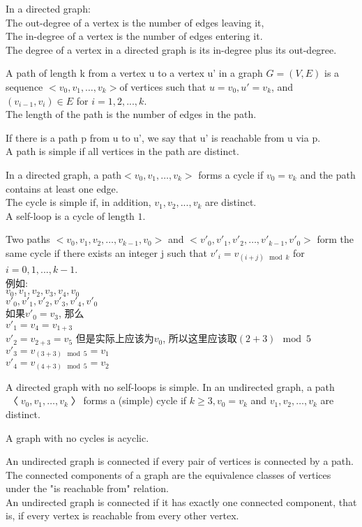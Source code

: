 \documentclass{article}
\begin{document}
\bigskip
In a directed graph:\\
The out-degree of a vertex is the number of edges leaving it,\\
The in-degree of a vertex is the number of edges entering it.\\
The degree of a vertex in a directed graph is its in-degree plus its out-degree.

A path of length k from a vertex u to a vertex u' in a graph $G = (V, E)$ is a sequence $<v_0, v_1, \ldots, v_k>$of vertices such that $u = v_0, u' =v_k$, and $(v_{i-1}, v_i) \in E$ for $i = 1, 2,..., k$. \\
The length of the path is the number of edges in the path.

If there is a path p from u to u', we say that u' is reachable from u via p.\\
A path is simple if all vertices in the path are distinct.

\bigskip
In a directed graph, a path$<v_0, v_1, \ldots, v_k>$ forms a cycle if $v_0=v_k$  and the path contains at least one edge. \\
The cycle is simple if, in addition, $v_1, v_2,..., v_k$ are distinct. \\
A self-loop is a cycle of length $1$.

Two paths $<v_0, v_1, v_2, \ldots,v_{k-1}, v_0>$  and $<v'_0, v'_1, v'_2, \ldots,v'_{k-1}, v'_0>$ form the same cycle if there exists an integer j such that $v'_i=v_{(i+j) \mod k}$ for $i = 0, 1,..., k - 1$.\\
例如:\\
$v_0, v_1, v_2, v_3, v_4, v_0$\\
$v'_0, v'_1, v'_2, v'_3, v'_4, v'_0$\\
如果$v'_0 = v_3$, 那么\\
$v'_1=v_4=v_{1+3}$\\
$v'_2=v_{2+3}=v_5$ 但是实际上应该为$v_0$, 所以这里应该取{$(2+3) \mod5$}\\
$v'_3=v_{(3+3)\mod 5}=v_1$\\
$v'_4=v_{(4+3) \mod 5}=v_2$

A directed graph with no self-loops is simple. In an undirected graph, a path$〈v_0, v_1, \ldots, v_k〉$forms a (simple) cycle if $k \geq 3,v_0 = v_k$ and $v_1, v_2, \ldots, v_k$ are distinct.

A graph with no cycles is acyclic.

\bigskip
An undirected graph is connected if every pair of vertices is connected by a path. \\
The connected components of a graph are the equivalence classes of vertices under the "is reachable from" relation.\\
An undirected graph is connected if it has exactly one connected component, that is, if every vertex is reachable from every other vertex.
\end{document}
